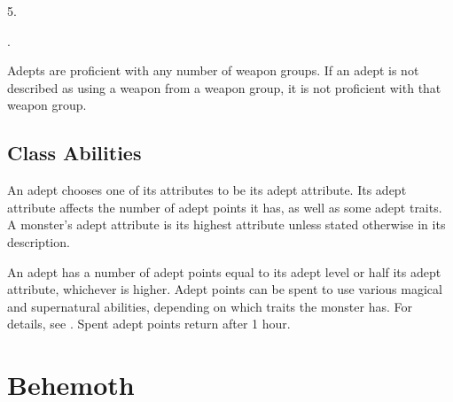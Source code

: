          5.

         .

        Adepts are proficient with any number of weapon groups.
        If an adept is not described as using a weapon from a weapon group, it is not proficient with that weapon group.

    \subsection{Class Abilities}

         An adept chooses one of its attributes to be its adept attribute.
        Its adept attribute affects the number of adept points it has, as well as some adept traits.
        A monster's adept attribute is its highest attribute unless stated otherwise in its description.

         An adept has a number of adept points equal to its adept level or half its adept attribute, whichever is higher.
        Adept points can be spent to use various magical and supernatural abilities, depending on which traits the monster has.
        For details, see .
        Spent adept points return after 1 hour.

\section{Behemoth}\label{Behemoth}

